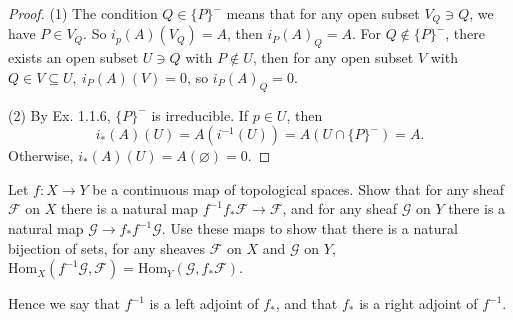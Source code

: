 \begin{proof}
	(1) The condition $Q\in \{P\}^-$ means that for any open subset $V_Q\ni Q$, we have $P\in V_Q$. So $i_p(A)(V_Q)=A$, then $i_P(A)_Q=A$. For $Q\notin \{P\}^-$, there exists an open subset $U\ni Q$ with $P\notin U$, then for any open subset $V$ with $Q\in V\subseteq U,\ i_P(A)(V)=0$, so $i_P(A)_Q=0$.
	
	
	(2) By Ex. 1.1.6, $\{P\}^-$ is irreducible. If $p\in U$, then $$i_*(A)(U)=A(i^{-1}(U))=A(U\cap \{P\}^-)=A.$$ Otherwise, $i_*(A)(U)=A(\varnothing)=0$.
\end{proof}
\begin{exe}
	\label{2.1.18}
	Let $f: X \rightarrow Y$ be a continuous map of topological spaces. Show that for any sheaf $\mathscr{F}$ on $X$ there is a natural map $f^{-1}f_{*}\mathscr{F} \rightarrow \mathscr{F}$, and for any sheaf $\mathscr{G}$ on $Y$ there is a natural map $\mathscr{G} \rightarrow f_{*}f^{-1}\mathscr{G}$. Use these maps to show that there is a natural bijection of sets, for any sheaves $\mathscr{F}$ on $X$ and $\mathscr{G}$ on $Y$, $\mathrm{Hom}_{X}(f^{-1}\mathscr{G}, \mathscr{F}) = \mathrm{Hom}_{Y}(\mathscr{G}, f_{*}\mathscr{F})$.
	
	Hence we say that $f^{-1}$ is a left adjoint of $f_{*}$, and that $f_{*}$ is a right adjoint of $f^{-1}$.
\end{exe}

